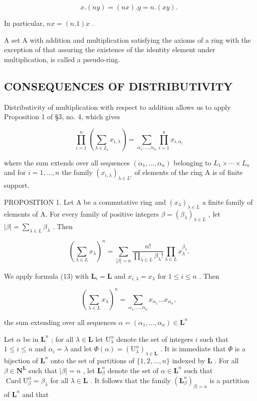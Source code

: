 \[
x. (n y) = (n x). y = n. (x y).
\]

In particular, \(nx = (n.1)x\) .

A set A with addition and multiplication satisfying the axioms of a ring with the exception of that assuring the existence of the identity element under multiplication, is called a pseudo-ring.

\subsection{CONSEQUENCES OF DISTRIBUTIVITY}

Distributivity of multiplication with respect to addition allows us to apply Proposition 1 of §3, no. 4, which gives

\[
\prod_ {i = 1} ^ {n} \left(\sum_ {\lambda \in L _ {i}} x _ {i, \lambda}\right) = \sum_ {\alpha_ {1}, \dots , \alpha_ {n}} \prod_ {i = 1} ^ {n} x _ {i, \alpha_ {i}}\tag{13}
\]

where the sum extends over all sequences \((\alpha_{1},\ldots,\alpha_{n})\) belonging to \(L_{1}\times\cdots\times L_{n}\) and for \(i=1,\ldots,n\) the family \((x_{i,\lambda})_{\lambda\in L^{i}}\) of elements of the ring A is of finite support.

PROPOSITION 1. Let A be a commutative ring and \((x_{\lambda})_{\lambda \in L}\) a finite family of elements of A. For every family of positive integers \(\beta = (\beta_{\lambda})_{\lambda \in L}\) , let \(|\beta| = \sum_{\lambda \in L} \beta_{\lambda}\) . Then

\[
\left(\sum_ {\lambda \in L} x _ {\lambda}\right) ^ {n} = \sum_ {| \beta | = n} \frac {n !}{\prod_ {\lambda \in L} \beta_ {\lambda} !} \prod_ {\lambda \in L} x _ {\lambda} ^ {\beta_ {\lambda}}.\tag{14}
\]

We apply formula (13) with \(\mathbf{L}_i = \mathbf{L}\) and \(x_{i,\lambda} = x_{\lambda}\) for \(1 \leqslant i \leqslant n\) . Then

\[
\left(\sum_ {\lambda \in L} x _ {\lambda}\right) ^ {n} = \sum_ {\alpha_ {1}, \dots , \alpha_ {n}} x _ {\alpha_ {1}} \dots x _ {\alpha_ {n}},\tag{15}
\]

the sum extending over all sequences \(\alpha = (\alpha_{1},\ldots ,\alpha_{n})\in \mathbf{L}^{n}\)

Let \(\alpha\) be in \(\mathbf{L}^n\) ; for all \(\lambda \in \mathbf{L}\) let \(\mathrm{U}_{\lambda}^{\alpha}\) denote the set of integers \(i\) such that \(1 \leqslant i \leqslant n\) and \(\alpha_i = \lambda\) and let \(\Phi(\alpha) = (\mathrm{U}_{\lambda}^{\alpha})_{\lambda \in \mathbf{L}}\) . It is immediate that \(\Phi\) is a bijection of \(\mathbf{L}^n\) onto the set of partitions of \(\{1, 2, \ldots, n\}\) indexed by \(\mathbf{L}\) . For all \(\beta \in \mathbf{N}^{\mathbf{L}}\) such that \(|\beta| = n\) , let \(\mathbf{L}_{\beta}^n\) denote the set of \(\alpha \in \mathbf{L}^n\) such that \(\operatorname{Card} \mathrm{U}_{\beta}^{\alpha} = \beta_{\lambda}\) for all \(\lambda \in \mathbf{L}\) . It follows that the family \((\mathbf{L}_{\beta}^n)_{\beta | = n}\) is a partition of \(\mathbf{L}^n\) and that

